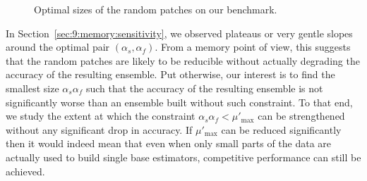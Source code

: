 \begin{figure}
\begin{center}
\caption{Optimal sizes of the random patches on our benchmark.}
\label{fig:9:memory}
\end{center}
\end{figure}

In Section~\ref{sec:9:memory:sensitivity}, we observed plateaus or very
gentle slopes around the optimal pair $(\alpha_s, \alpha_f)$.  From a memory point of
view, this suggests that the random patches are likely to be reducible without
actually degrading the accuracy of the resulting ensemble. Put otherwise, our
interest is to find the smallest size $\alpha_s \alpha_f$ such that the accuracy of the
resulting ensemble is not significantly worse than an ensemble built without
such constraint. To that end, we study the extent at which the constraint $\alpha_s
\alpha_f < \mu'_{\text{max}}$ can be strengthened without any significant drop in
accuracy. If $\mu'_{\text{max}}$ can be reduced significantly then it would indeed mean that
even when only small parts of the data are actually used to build single base
estimators, competitive performance can still be achieved.

